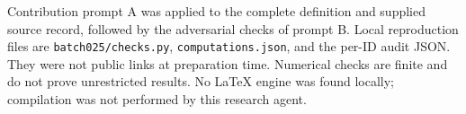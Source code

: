 \documentclass[11pt]{article}
\begin{document}
Contribution prompt A was applied to the complete definition and supplied source record, followed by the adversarial checks of prompt B. Local reproduction files are \texttt{batch025/checks.py}, \texttt{computations.json}, and the per-ID audit JSON. They were not public links at preparation time. Numerical checks are finite and do not prove unrestricted results. No LaTeX engine was found locally; compilation was not performed by this research agent.
\end{document}
